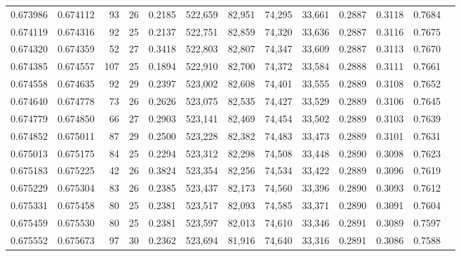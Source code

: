 \begin{tabular}{rrrrrrrrrrrrr}
0.673986 & 0.674112 &    93 &  26 &                                     0.2185 & 522,659 &  82,951 &  74,295 &  33,661 & 0.2887 & 0.3118 & 0.7684 \\
0.674119 & 0.674316 &    92 &  25 &                                     0.2137 & 522,751 &  82,859 &  74,320 &  33,636 & 0.2887 & 0.3116 & 0.7675 \\
0.674320 & 0.674359 &    52 &  27 &                                     0.3418 & 522,803 &  82,807 &  74,347 &  33,609 & 0.2887 & 0.3113 & 0.7670 \\
0.674385 & 0.674557 &   107 &  25 &                                     0.1894 & 522,910 &  82,700 &  74,372 &  33,584 & 0.2888 & 0.3111 & 0.7661 \\
0.674558 & 0.674635 &    92 &  29 &                                     0.2397 & 523,002 &  82,608 &  74,401 &  33,555 & 0.2889 & 0.3108 & 0.7652 \\
0.674640 & 0.674778 &    73 &  26 &                                     0.2626 & 523,075 &  82,535 &  74,427 &  33,529 & 0.2889 & 0.3106 & 0.7645 \\
0.674779 & 0.674850 &    66 &  27 &                                     0.2903 & 523,141 &  82,469 &  74,454 &  33,502 & 0.2889 & 0.3103 & 0.7639 \\
0.674852 & 0.675011 &    87 &  29 &                                     0.2500 & 523,228 &  82,382 &  74,483 &  33,473 & 0.2889 & 0.3101 & 0.7631 \\
0.675013 & 0.675175 &    84 &  25 &                                     0.2294 & 523,312 &  82,298 &  74,508 &  33,448 & 0.2890 & 0.3098 & 0.7623 \\
0.675183 & 0.675225 &    42 &  26 &                                     0.3824 & 523,354 &  82,256 &  74,534 &  33,422 & 0.2889 & 0.3096 & 0.7619 \\
0.675229 & 0.675304 &    83 &  26 &                                     0.2385 & 523,437 &  82,173 &  74,560 &  33,396 & 0.2890 & 0.3093 & 0.7612 \\
0.675331 & 0.675458 &    80 &  25 &                                     0.2381 & 523,517 &  82,093 &  74,585 &  33,371 & 0.2890 & 0.3091 & 0.7604 \\
0.675459 & 0.675530 &    80 &  25 &                                     0.2381 & 523,597 &  82,013 &  74,610 &  33,346 & 0.2891 & 0.3089 & 0.7597 \\
0.675552 & 0.675673 &    97 &  30 &                                     0.2362 & 523,694 &  81,916 &  74,640 &  33,316 & 0.2891 & 0.3086 & 0.7588 \\

\end{tabular}
